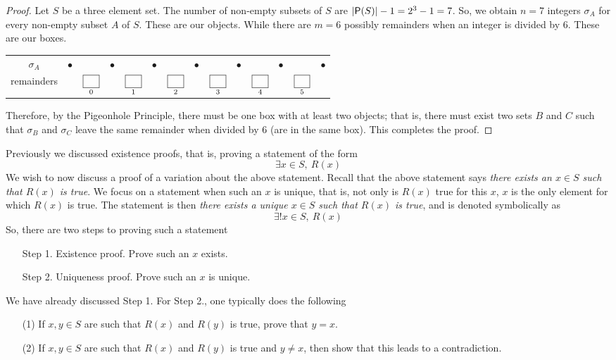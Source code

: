 \begin{proof}
Let $S$ be a three element set. The number of non-empty subsets of $S$ are $\left\lvert\mathsf{P}(S)\right\rvert - 1 = 2^3 - 1 = 7$. So, we obtain $n = 7$ integers $\sigma_A$ for every non-empty subset $A$ of $S$. These are our objects. While there are $m = 6$ possibly remainders when an integer is divided by $6$. These are our boxes.

\begin{center}
\begin{tabular}{cccccccccccccc}
$\sigma_A$ & $\bullet$ && $\bullet$ && $\bullet$ && $\bullet$ && $\bullet$ && $\bullet$ && $\bullet$\\[1em]
remainders && $\underset{0}{\fbox{\phantom{11}}}$ && $\underset{1}{\fbox{\phantom{11}}}$ && $\underset{2}{\fbox{\phantom{11}}}$ && $\underset{3}{\fbox{\phantom{11}}}$ && $\underset{4}{\fbox{\phantom{11}}}$ && $\underset{5}{\fbox{\phantom{11}}}$
\end{tabular}
\end{center}

Therefore, by the Pigeonhole Principle, there must be one box with at least two objects; that is, there must exist two sets $B$ and $C$ such that $\sigma_B$ and $\sigma_C$ leave the same remainder when divided by $6$ (are in the same box). This completes the proof. 
\end{proof}

\vspace*{1em}

\begin{discussion}
Previously we discussed existence proofs, that is, proving a statement of the form
\[\exists x \in S,\ R(x)\]
We wish to now discuss a proof of a variation about the above statement. Recall that the above statement says \emph{there exists an $x \in S$ such that $R(x)$ is true}. We focus on a statement when such an $x$ is unique, that is, not only is $R(x)$ true for this $x$, $x$ is the only element for which $R(x)$ is true. The statement is then \emph{there exists a unique $x \in S$ such that $R(x)$ is true}, and is denoted symbolically as
\[\exists ! x \in S,\ R(x)\]
So, there are two steps to proving such a statement
\begin{itemize}
\item[] Step 1. Existence proof. Prove such an $x$ exists.
\item[] Step 2. Uniqueness proof. Prove such an $x$ is unique.
\end{itemize}
We have already discussed Step 1. For Step 2., one typically does the following
\begin{itemize}
\item[(1)] If $x,y \in S$ are such that $R(x)$ and $R(y)$ is true, prove that $y = x$.
\item[(2)] If $x,y \in S$ are such that $R(x)$ and $R(y)$ is true and $y \neq x$, then show that this leads to a contradiction.
\end{itemize}
\end{discussion}


